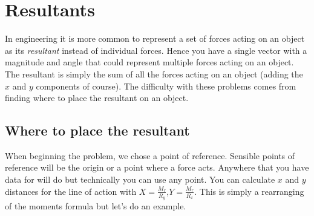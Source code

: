\documentclass[a4paper, 12pt]{article}
\begin{document}
\section{Resultants}
In engineering it is more common to represent a set of forces acting on an object as its \textit{resultant} instead of individual forces.
Hence you have a single vector with a magnitude and angle that could represent multiple forces acting on an object. 
The resultant is simply the sum of all the forces acting on an object (adding the $x$ and $y$ components of course). 
The difficulty with these problems comes from finding where to place the resultant on an object.
\subsection{Where to place the resultant} 
When beginning the problem, we chose a point of reference.
Sensible points of reference will be the origin or a point where a force acts.
Anywhere that you have data for will do but technically you can use any point.
You can calculate $x$ and $y$ distances for the line of action with $X=\frac{M_r}{R_y}$,$Y=\frac{M_r}{R_x}$.
This is simply a rearranging of the moments formula but let's do an example.
\end{document}

